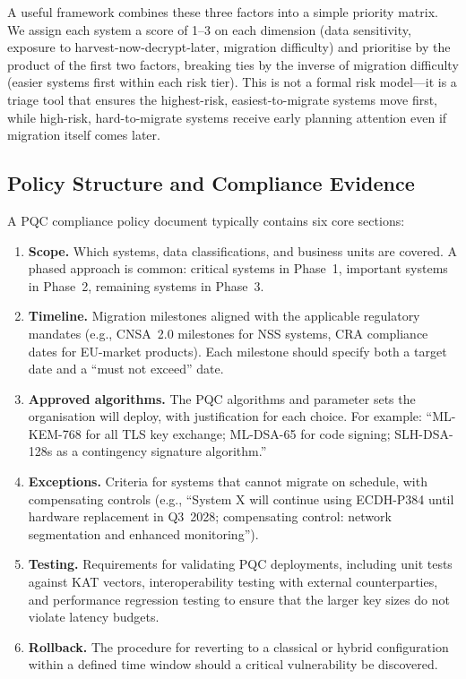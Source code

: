 A useful framework combines these three factors into a simple priority matrix. We assign each system a score of 1--3 on each dimension (data sensitivity, exposure to harvest-now-decrypt-later, migration difficulty) and prioritise by the product of the first two factors, breaking ties by the inverse of migration difficulty (easier systems first within each risk tier). This is not a formal risk model---it is a triage tool that ensures the highest-risk, easiest-to-migrate systems move first, while high-risk, hard-to-migrate systems receive early planning attention even if migration itself comes later.

\subsection{Policy Structure and Compliance Evidence}
\label{subsec:policy-structure}

A PQC compliance policy document typically contains six core sections:

\begin{enumerate}
\item \textbf{Scope.} Which systems, data classifications, and business units are covered. A phased approach is common: critical systems in Phase~1, important systems in Phase~2, remaining systems in Phase~3.
\item \textbf{Timeline.} Migration milestones aligned with the applicable regulatory mandates (e.g., CNSA~2.0 milestones for NSS systems, CRA compliance dates for EU-market products). Each milestone should specify both a target date and a ``must not exceed'' date.
\item \textbf{Approved algorithms.} The PQC algorithms and parameter sets the organisation will deploy, with justification for each choice. For example: ``ML-KEM-768 for all TLS key exchange; ML-DSA-65 for code signing; SLH-DSA-128s as a contingency signature algorithm.''
\item \textbf{Exceptions.} Criteria for systems that cannot migrate on schedule, with compensating controls (e.g., ``System X will continue using ECDH-P384 until hardware replacement in Q3~2028; compensating control: network segmentation and enhanced monitoring'').
\item \textbf{Testing.} Requirements for validating PQC deployments, including unit tests against KAT vectors, interoperability testing with external counterparties, and performance regression testing to ensure that the larger key sizes do not violate latency budgets.
\item \textbf{Rollback.} The procedure for reverting to a classical or hybrid configuration within a defined time window should a critical vulnerability be discovered.
\end{enumerate}

